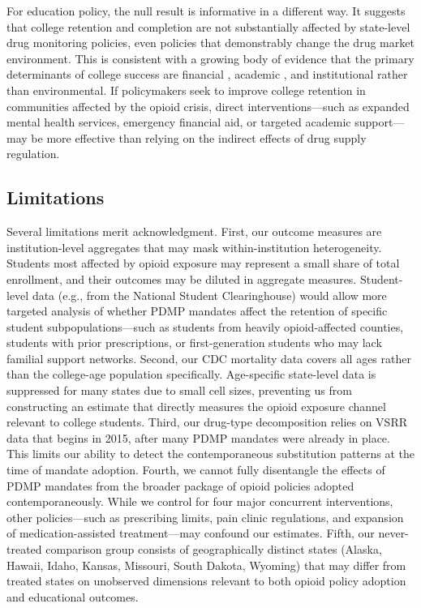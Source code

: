\documentclass[12pt]{article}
\begin{document}
For education policy, the null result is informative in a different way. It suggests that college retention and completion are not substantially affected by state-level drug monitoring policies, even policies that demonstrably change the drug market environment. This is consistent with a growing body of evidence that the primary determinants of college success are financial \citep{dynarski2021act, denning2019propensity}, academic \citep{bound2010have}, and institutional \citep{lovenheim2011effect} rather than environmental. If policymakers seek to improve college retention in communities affected by the opioid crisis, direct interventions---such as expanded mental health services, emergency financial aid, or targeted academic support---may be more effective than relying on the indirect effects of drug supply regulation.

\subsection{Limitations}

Several limitations merit acknowledgment. First, our outcome measures are institution-level aggregates that may mask within-institution heterogeneity. Students most affected by opioid exposure may represent a small share of total enrollment, and their outcomes may be diluted in aggregate measures. Student-level data (e.g., from the National Student Clearinghouse) would allow more targeted analysis of whether PDMP mandates affect the retention of specific student subpopulations---such as students from heavily opioid-affected counties, students with prior prescriptions, or first-generation students who may lack familial support networks. Second, our CDC mortality data covers all ages rather than the college-age population specifically. Age-specific state-level data is suppressed for many states due to small cell sizes, preventing us from constructing an estimate that directly measures the opioid exposure channel relevant to college students. Third, our drug-type decomposition relies on VSRR data that begins in 2015, after many PDMP mandates were already in place. This limits our ability to detect the contemporaneous substitution patterns at the time of mandate adoption. Fourth, we cannot fully disentangle the effects of PDMP mandates from the broader package of opioid policies adopted contemporaneously. While we control for four major concurrent interventions, other policies---such as prescribing limits, pain clinic regulations, and expansion of medication-assisted treatment---may confound our estimates. Fifth, our never-treated comparison group consists of geographically distinct states (Alaska, Hawaii, Idaho, Kansas, Missouri, South Dakota, Wyoming) that may differ from treated states on unobserved dimensions relevant to both opioid policy adoption and educational outcomes.
\end{document}
